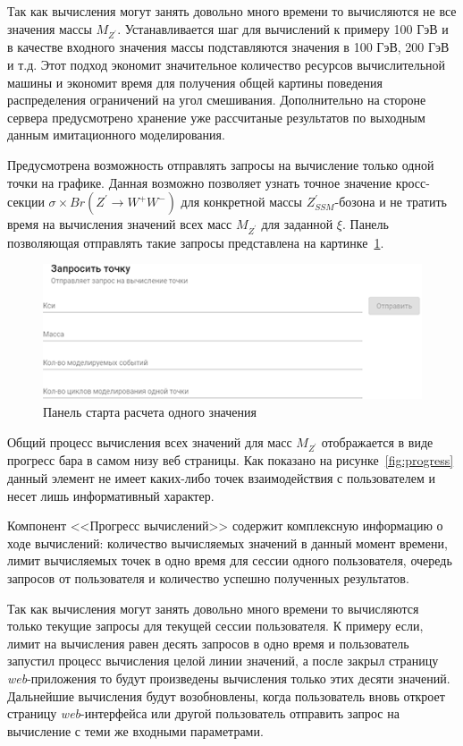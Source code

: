 Так как вычисления могут занять довольно много времени то вычисляются не все значения массы ${M}_{{Z}^{\prime}}$. Устанавливается шаг для вычислений к примеру 100 ГэВ и в качестве входного значения массы подставляются значения в 100 ГэВ, 200 ГэВ и т.д. Этот подход экономит значительное количество ресурсов вычислительной машины и экономит время для получения общей картины поведения распределения ограничений на угол смешивания. Дополнительно на стороне сервера предусмотрено хранение уже рассчитаные результатов по выходным данным имитационного моделирования.


Предусмотрена возможность отправлять запросы на вычисление только одной точки на графике. Данная возможно позволяет узнать точное значение кросс-секции $\sigma \times Br({Z}^{\prime} \rightarrow {W}^{+}{W}^{-})$ для конкретной массы ${Z}^{\prime}_{SSM}$-бозона и не тратить время на вычисления значений всех масс ${M}_{{Z}^{\prime}}$ для заданной $\xi$. Панель позволяющая отправлять такие запросы представлена на картинке~\ref{fig:request-point}.

\vspace{16pt}
\begin{figure}[!h]
	\centering
	\includegraphics[width=\textwidth]{figures/request-point.png}
	\caption{Панель старта расчета одного значения}
	\label{fig:request-point}
\end{figure}

Общий процесс вычисления всех значений для масс ${M}_{{Z}^{\prime}}$ отображается в виде прогресс бара в самом низу веб страницы. Как показано на рисунке~\ref{fig:progress} данный элемент не имеет каких-либо точек взаимодействия с пользователем и несет лишь информативный характер.

Компонент <<Прогресс вычислений>> содержит комплексную информацию о ходе вычислений: количество вычисляемых значений в данный момент времени, лимит вычисляемых точек в одно время для сессии одного пользователя, очередь запросов от пользователя и количество успешно полученных результатов.

Так как вычисления могут занять довольно много времени то вычисляются только текущие запросы для текущей сессии пользователя. К примеру если, лимит на вычисления равен десять запросов в одно время и пользователь запустил процесс вычисления целой линии значений, а после закрыл страницу \textit{web}-приложения то будут произведены вычисления только этих десяти значений. Дальнейшие вычисления будут возобновлены, когда пользователь вновь откроет страницу \textit{web}-интерфейса или другой пользователь отправить запрос на вычисление с теми же входными параметрами.

